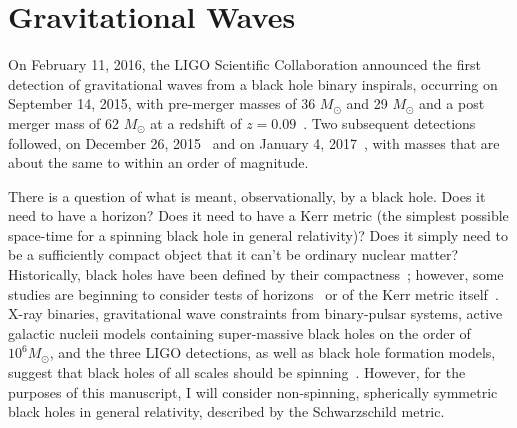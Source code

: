 \section{Gravitational Waves}

On February 11, 2016, the LIGO Scientific Collaboration announced the
first detection of gravitational waves from a black hole binary
inspirals, occurring on September 14, 2015, with pre-merger masses of
36 $M_\odot$ and 29 $M_\odot$ and a post merger mass of 62 $M_\odot$
at a redshift of $z=0.09$~\cite{GW150914}. Two subsequent detections
followed, on December 26, 2015~\cite{GW151226} and on January 4,
2017~\cite{GW170104}, with masses that are about the same to within an order of magnitude.

There is a question of what is meant, observationally, by a black hole. Does it need to have a horizon? Does it need to have a Kerr metric (the simplest possible space-time for a spinning black hole in general relativity)? Does it simply need to be a sufficiently compact object that it can't be ordinary nuclear matter? Historically, black holes have been defined by their compactness~\cite{Bambi2017}; however, some studies are beginning to consider tests of horizons~\cite{} or of the Kerr metric itself~\cite{Bambi2017}. X-ray binaries, gravitational wave constraints from binary-pulsar systems, active galactic nucleii models containing super-massive black holes on the order of $10^6 M_\odot$, and the three LIGO detections, as well as black hole formation models, suggest that black holes of all scales should be spinning~\cite{Bambi2017}. However, for the purposes of this manuscript, I will consider non-spinning, spherically symmetric black holes in general relativity, described by the Schwarzschild metric.

